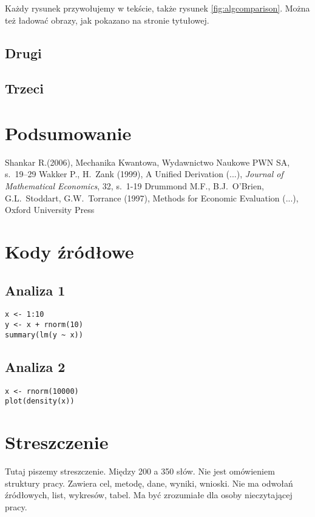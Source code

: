 \documentclass[12pt,a4paper,twoside,openany]{book}
\begin{document}
Każdy rysunek przywołujemy w tekście, także rysunek \ref{fig:algcomparison}. Można też ładować obrazy, jak pokazano na stronie tytułowej.

\section{Drugi}

\section{Trzeci}

\clearpage

\chapter{Podsumowanie}

\clearpage
{}
\begin{thebibliography}{99}
\setlength{\itemsep}{0pt}%
 Shankar R.(2006), Mechanika Kwantowa, Wydawnictwo Naukowe PWN SA, s.~19--29
 Wakker P., H.~Zank (1999), A Unified Derivation (...), \textit{Journal of  Mathematical Economics}, 32, s.~1-19
 Drummond M.F., B.J.~O'Brien, G.L.~Stoddart, G.W.~Torrance (1997), Methods for Economic Evaluation (...), Oxford University Press
\end{thebibliography}

\clearpage
{}
\listoffigures

\clearpage
\listoftables
{}

\appendix
\chapter*{Kody źródłowe}

\section*{Analiza 1}
\begin{verbatim}
x <- 1:10
y <- x + rnorm(10)
summary(lm(y ~ x))
\end{verbatim}

\section*{Analiza 2}
\begin{verbatim}
x <- rnorm(10000)
plot(density(x))
\end{verbatim}

\clearpage

\chapter*{Streszczenie}

Tutaj piszemy streszczenie. Między 200 a 350 słów. Nie jest omówieniem struktury pracy. Zawiera cel, metodę, dane, wyniki, wnioski. Nie ma odwołań źródłowych, list, wykresów, tabel. Ma być zrozumiałe dla osoby nieczytającej pracy.
\end{document}
